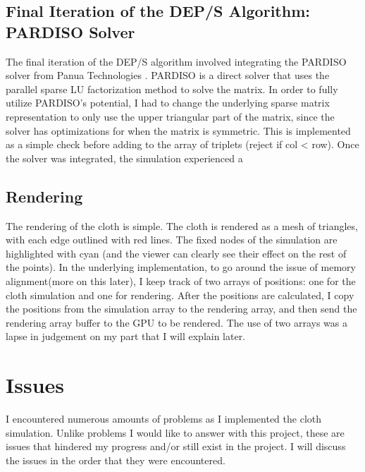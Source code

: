 \documentclass[letterpaper, 10 pt, conference]{ieeeconf}  %
\begin{document}
\subsection{Final Iteration of the DEP/S Algorithm: PARDISO Solver}
The final iteration of the DEP/S algorithm involved integrating the PARDISO solver from Panua Technologies \cite{Pasadakis2023} \cite{EFTEKHARI2021101389} \cite{gaedkemerzhäuser2022}. PARDISO is a direct solver that uses the parallel sparse LU factorization method to solve the matrix. In order to fully utilize PARDISO's potential, I had to change the underlying sparse matrix representation to only use the upper triangular part of the matrix, since the solver has optimizations for when the matrix is symmetric. This is implemented as a simple check before adding to the array of triplets (reject if col < row). Once the solver was integrated, the simulation experienced a 

\subsection{Rendering}
The rendering of the cloth is simple. The cloth is rendered as a mesh of triangles, with each edge outlined with red lines. The fixed nodes of the simulation are highlighted with cyan (and the viewer can clearly see their effect on the rest of the points). In the underlying implementation, to go around the issue of memory alignment(more on this later), I keep track of two arrays of positions: one for the cloth simulation and one for rendering. After the positions are calculated, I copy the positions from the simulation array to the rendering array, and then send the rendering array buffer to the GPU to be rendered. The use of two arrays was a lapse in judgement on my part that I will explain later. 


\section{Issues}
        I encountered numerous amounts of problems as I implemented the cloth simulation. Unlike problems I would like to answer with this project, these are issues that hindered my progress and/or still exist in the project. I will discuss the issues in the order that they were encountered.
\end{document}
